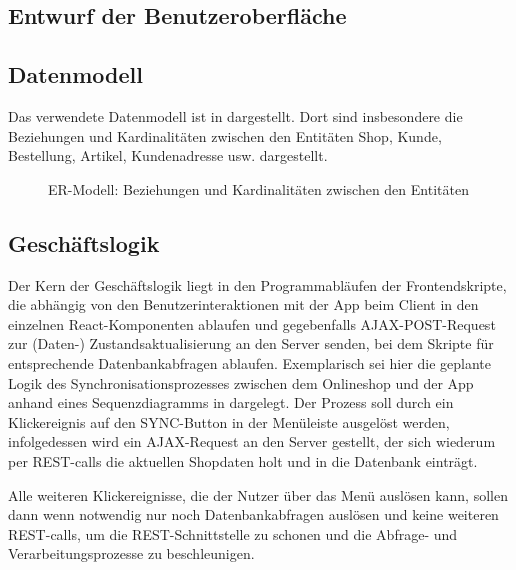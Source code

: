 \subsection{Entwurf der Benutzeroberfläche}
\label{sec:Benutzeroberflaeche} 

\subsection{Datenmodell}
\label{sec:Datenmodell}
Das verwendete Datenmodell ist in  dargestellt. Dort sind insbesondere die Beziehungen und Kardinalitäten zwischen den Entitäten Shop, Kunde, Bestellung, Artikel, Kundenadresse usw. dargestellt.  
\begin{figure}[htb]
\centering
{}
\caption{ER-Modell: Beziehungen und Kardinalitäten zwischen den Entitäten}
\label{fig:erm2}
\end{figure}
\subsection{Geschäftslogik}
\label{sec:Geschaeftslogik}

Der Kern der Geschäftslogik liegt in den Programmabläufen der Frontendskripte, die abhängig von den Benutzerinteraktionen mit der App beim Client in den einzelnen React-Komponenten ablaufen und gegebenfalls AJAX-POST-Request zur (Daten-) Zustandsaktualisierung an den Server senden, bei dem Skripte für entsprechende Datenbankabfragen ablaufen. Exemplarisch sei hier die geplante Logik des Synchronisationsprozesses zwischen dem Onlineshop und der App anhand eines Sequenzdiagramms in  dargelegt.
Der Prozess soll durch ein Klickereignis auf den SYNC-Button in der Menüleiste ausgelöst werden, infolgedessen wird ein AJAX-Request an den Server gestellt, der sich wiederum per REST-calls die aktuellen Shopdaten holt und in die Datenbank einträgt.

Alle weiteren Klickereignisse, die der Nutzer über das Menü auslösen kann, sollen dann wenn notwendig nur noch Datenbankabfragen auslösen und keine weiteren REST-calls, um die REST-Schnittstelle zu schonen und die Abfrage- und Verarbeitungsprozesse zu beschleunigen.

